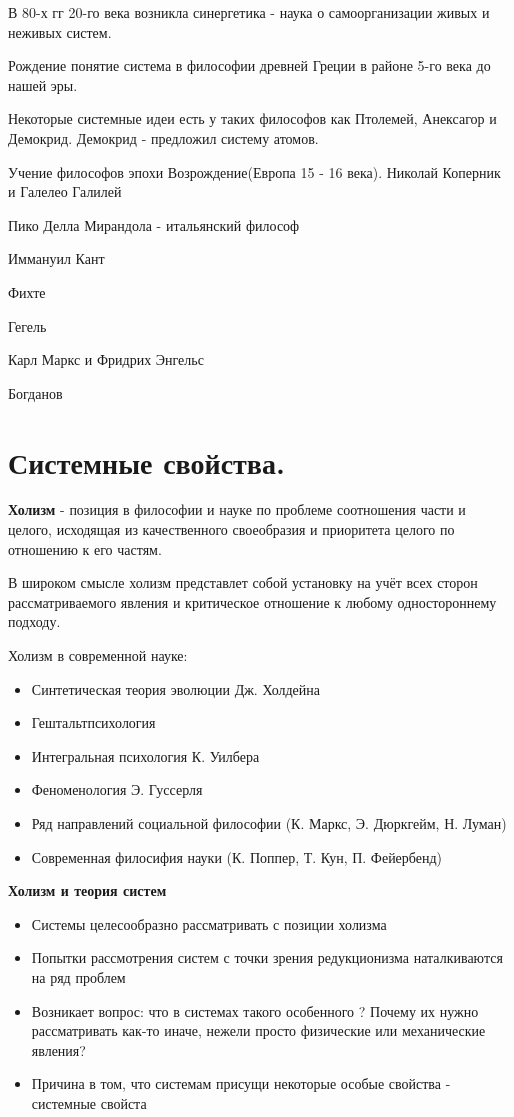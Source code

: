 \documentclass[a4paper]{article}
\begin{document}
	В 80-х гг 20-го века возникла синергетика - наука о самоорганизации живых и неживых систем.
	
	Рождение понятие система в философии древней Греции в районе 5-го века до нашей эры.
	
	Некоторые системные идеи есть у таких философов как Птолемей, Анексагор и Демокрид. Демокрид - предложил систему атомов.
	
	Учение философов эпохи Возрождение(Европа 15 - 16 века). Николай Коперник и Галелео Галилей
	
	Пико Делла Мирандола - итальянский философ
	
	Иммануил Кант
	
	Фихте 
	
	Гегель 
	
	Карл Маркс и Фридрих Энгельс
	
	Богданов
	
	
		\section{Системные свойства.}
	
	\textbf{Холизм} - позиция в философии и науке по проблеме соотношения части и целого, исходящая из качественного своеобразия и приоритета целого по отношению к его частям.
	
	В широком смысле холизм представлет собой установку на учёт всех сторон рассматриваемого явления и критическое отношение к любому одностороннему подходу.
	
	Холизм в современной науке:
		\begin{itemize}
		\item Синтетическая теория эволюции Дж. Холдейна
		\item Гештальтпсихология
		\item Интегральная психология К. Уилбера
		\item Феноменология Э. Гуссерля
		\item Ряд направлений социальной философии (К. Маркс, Э. Дюркгейм, Н. Луман)
		\item  Современная филосифия науки (К. Поппер, Т. Кун, П. Фейербенд)
	\end{itemize}

	\textbf{Холизм и теория систем}
		\begin{itemize}
		\item Системы целесообразно рассматривать с позиции холизма
		\item Попытки рассмотрения систем с точки зрения редукционизма наталкиваются на ряд проблем
		\item  Возникает вопрос: что в системах такого особенного ? Почему их нужно рассматривать как-то иначе, нежели просто физические или механические явления?
		\item Причина в том, что системам присущи некоторые особые свойства - системные свойста
	\end{itemize}
\end{document}
